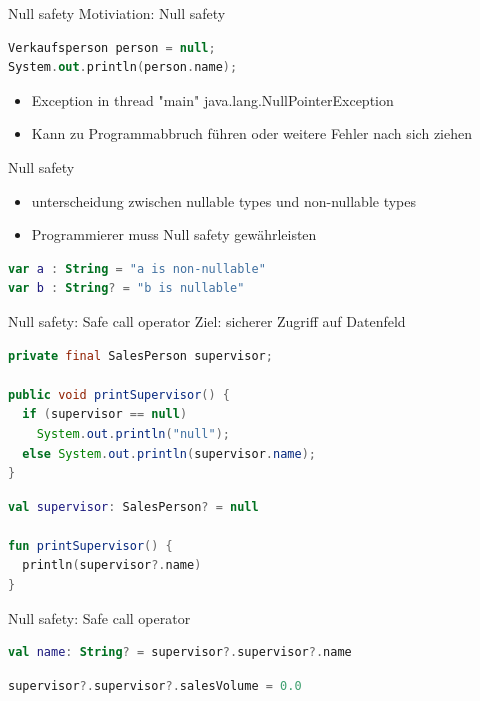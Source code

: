 \documentclass{beamer}
\begin{document}

\begin{frame}[fragile]{Null safety}
  Motiviation: Null safety
  \begin{lstlisting}[language=Kotlin, title=Java example, xleftmargin=1em]
Verkaufsperson person = null;
System.out.println(person.name);
  \end{lstlisting}
  \begin{itemize}
    \item Exception in thread "main" java.lang.NullPointerException %
    \item Kann zu Programmabbruch führen oder weitere Fehler nach sich ziehen
  \end{itemize}
\end{frame}

\begin{frame}[fragile]{Null safety}
  \begin{itemize}
    \item unterscheidung zwischen nullable types und non-nullable types
    \item Programmierer muss Null safety gewährleisten
  \end{itemize}
  \begin{lstlisting}[language=Kotlin]
var a : String = "a is non-nullable"
var b : String? = "b is nullable"
  \end{lstlisting}
\end{frame}

\begin{frame}[fragile]{Null safety: Safe call operator}
  Ziel: sicherer Zugriff auf Datenfeld
  \begin{lstlisting}[language=Java, title=in Java]
private final SalesPerson supervisor;

public void printSupervisor() {
  if (supervisor == null)
    System.out.println("null");
  else System.out.println(supervisor.name);
}
  \end{lstlisting}
  \begin{lstlisting}[language=Kotlin, title=in Kotlin]
val supervisor: SalesPerson? = null

fun printSupervisor() {
  println(supervisor?.name)
} 
  \end{lstlisting}
\end{frame}

\begin{frame}[fragile]{Null safety: Safe call operator}
  \begin{lstlisting}[language=Kotlin]
val name: String? = supervisor?.supervisor?.name   
  \end{lstlisting}
  \begin{lstlisting}[language=Kotlin]
supervisor?.supervisor?.salesVolume = 0.0
  \end{lstlisting}
\end{frame}
\end{document}
